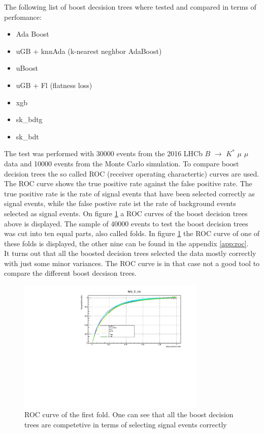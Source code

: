 \documentclass[english]{uzhpub}
\begin{document}
 The following list of boost decsision trees where tested and compared in terms of perfomance:
 \begin{itemize}
  \item Ada Boost \cite{bib:AdaBoost}
  \item uGB \cite{bib:ugb} + knnAda (k-nearest neghbor AdaBoost)
  \item uBoost \cite{bib:uBoost}
  \item uGB \cite{bib:ugb} + Fl (flatness loss)
  \item xgb \cite{bib:xgb}
  \item sk\_bdtg \cite{bib:bdtg}
  \item sk\_bdt \cite{bib:bdt}
 \end{itemize}
 The test was performed with 30000 events from the 2016 LHCb $B$ $\rightarrow$ $K^{*}$ $\mu$ $\mu$ data and 10000 events from the Monte Carlo simulation.
To compare boost decision trees the so called ROC (receiver operating charactertic) curves are used. The ROC curve shows the true positive rate against the false positive rate. The true positive rate is the rate of signal events that have been selected correctly as signal events, while the false postive rate ist the rate of background events selected as signal events. On figure \ref{fig:roc} a ROC curves of the boost decision trees above is displayed.
The sample of 40000 events to test the boost decision trees was cut into ten equal parts, also called folds. In figure \ref{fig:roc} the ROC curve of one of these folds is displayed, the other nine can be found in the appendix \ref{app:roc}. \\
 It turns out that all the boosted decision trees selected the data mostly correctly with just some minor variances. The ROC curve is in that case not a good tool to compare the different boost decsison trees.
 \begin{figure}[H]
  \centering
  \includegraphics[width=0.8\textwidth]{roc/fold_0_roc.pdf}
  \caption{ROC curve of the first fold. One can see that all the boost decision trees are competetive in terms of selecting signal events correctly}
  \label{fig:roc}
 \end{figure}
\end{document}

